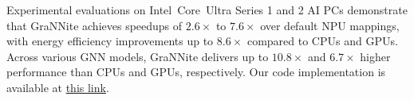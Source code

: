 {Experimental evaluations on Intel\textregistered\ Core\texttrademark\ Ultra Series 1 and 2 AI PCs demonstrate that GraNNite achieves speedups of $\mathbf{2.6\times}$ to $\mathbf{7.6\times}$ over default NPU mappings, with energy efficiency improvements up to $\mathbf{8.6\times}$ compared to CPUs and GPUs. Across various GNN models, GraNNite delivers up to $\mathbf{10.8\times}$ and $\mathbf{6.7\times}$ higher performance than CPUs and GPUs, respectively.}
Our code implementation is available at \href{https://github.com/arghadippurdue/GraNNite}{this link}.

